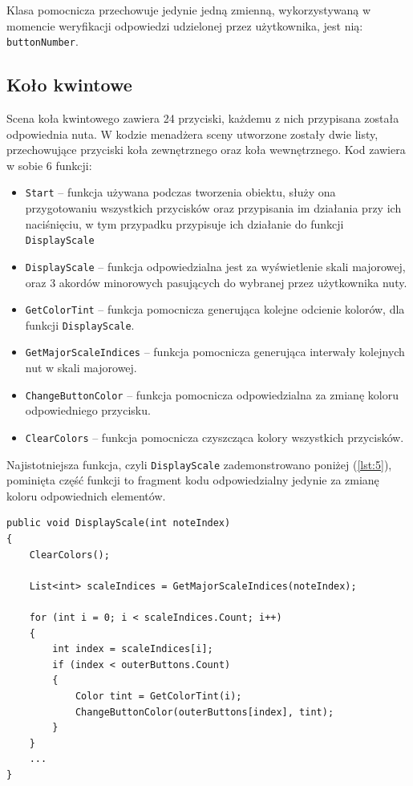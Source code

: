 Klasa pomocnicza przechowuje jedynie jedną zmienną, wykorzystywaną w momencie weryfikacji odpowiedzi udzielonej przez użytkownika, jest nią: \texttt{buttonNumber}.

\subsection{Koło kwintowe}

Scena koła kwintowego zawiera 24 przyciski, każdemu z nich przypisana została odpowiednia nuta. W kodzie menadżera sceny utworzone zostały dwie listy, przechowujące przyciski koła zewnętrznego oraz koła wewnętrznego. Kod zawiera w sobie 6 funkcji:

\begin{itemize}
\item \texttt{Start} -- funkcja używana podczas tworzenia obiektu, służy ona przygotowaniu wszystkich przycisków oraz przypisania im działania przy ich naciśnięciu, w tym przypadku przypisuje ich działanie do funkcji \texttt{DisplayScale}
\item \texttt{DisplayScale} -- funkcja odpowiedzialna jest za wyświetlenie skali majorowej, oraz 3 akordów minorowych pasujących do wybranej przez użytkownika nuty. 
\item \texttt{GetColorTint} -- funkcja pomocnicza generująca kolejne odcienie kolorów, dla funkcji \texttt{DisplayScale}.
\item \texttt{GetMajorScaleIndices} -- funkcja pomocnicza generująca interwały kolejnych nut w skali majorowej.
\item \texttt{ChangeButtonColor} -- funkcja pomocnicza odpowiedzialna za zmianę koloru odpowiedniego przycisku.
\item \texttt{ClearColors} -- funkcja pomocnicza czyszcząca kolory wszystkich przycisków.
\end{itemize}

Najistotniejsza funkcja, czyli \texttt{DisplayScale} zademonstrowano poniżej (\ref{lst:5}), pominięta część funkcji to fragment kodu odpowiedzialny jedynie za zmianę koloru odpowiednich elementów.

\begin{lstlisting}[style=sharpcstyle,caption=Funkcja \texttt{DisplayScale}, label=lst:5]
public void DisplayScale(int noteIndex)
{
    ClearColors();

    List<int> scaleIndices = GetMajorScaleIndices(noteIndex);

    for (int i = 0; i < scaleIndices.Count; i++)
    {
        int index = scaleIndices[i];
        if (index < outerButtons.Count)
        {
            Color tint = GetColorTint(i);
            ChangeButtonColor(outerButtons[index], tint);
        }
    }
    ...         
}
\end{lstlisting}

